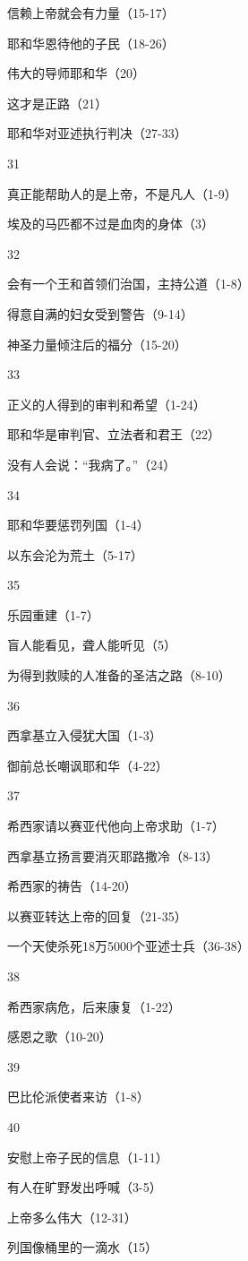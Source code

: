信赖上帝就会有力量（15-17）

耶和华恩待他的子民（18-26）

伟大的导师耶和华（20）

这才是正路（21）

耶和华对亚述执行判决（27-33）

31

真正能帮助人的是上帝，不是凡人（1-9）

埃及的马匹都不过是血肉的身体（3）

32

会有一个王和首领们治国，主持公道（1-8）

得意自满的妇女受到警告（9-14）

神圣力量倾注后的福分（15-20）

33

正义的人得到的审判和希望（1-24）

耶和华是审判官、立法者和君王（22）

没有人会说：“我病了。”（24）

34

耶和华要惩罚列国（1-4）

以东会沦为荒土（5-17）

35

乐园重建（1-7）

盲人能看见，聋人能听见（5）

为得到救赎的人准备的圣洁之路（8-10）

36

西拿基立入侵犹大国（1-3）

御前总长嘲讽耶和华（4-22）

37

希西家请以赛亚代他向上帝求助（1-7）

西拿基立扬言要消灭耶路撒冷（8-13）

希西家的祷告（14-20）

以赛亚转达上帝的回复（21-35）

一个天使杀死18万5000个亚述士兵（36-38）

38

希西家病危，后来康复（1-22）

感恩之歌（10-20）

39

巴比伦派使者来访（1-8）

40

安慰上帝子民的信息（1-11）

有人在旷野发出呼喊（3-5）

上帝多么伟大（12-31）

列国像桶里的一滴水（15）

